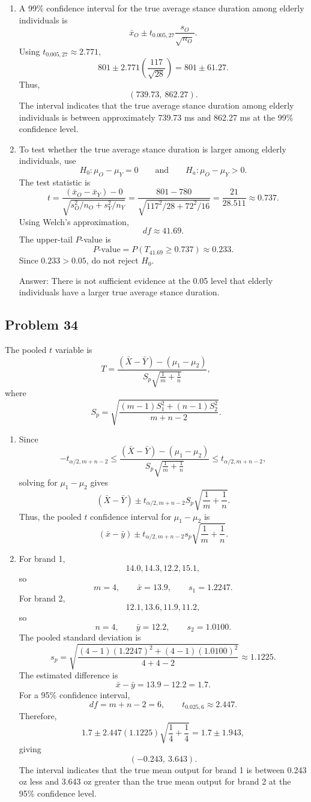 \documentclass[11pt]{article}
\begin{document}
\begin{enumerate}
\item[(a)] A 99\% confidence interval for the true average stance duration among elderly individuals is
\[
\bar{x}_O\pm t_{0.005,27}\frac{s_O}{\sqrt{n_O}}.
\]
Using $t_{0.005,27}\approx 2.771$,
\[
801\pm 2.771\left(\frac{117}{\sqrt{28}}\right)
=801\pm 61.27.
\]
Thus,
\[
(739.73,\ 862.27).
\]
The interval indicates that the true average stance duration among elderly individuals is between approximately 739.73 ms and 862.27 ms at the 99\% confidence level.

\item[(b)] To test whether the true average stance duration is larger among elderly individuals, use
\[
H_0:\mu_O-\mu_Y=0
\qquad \text{and} \qquad
H_a:\mu_O-\mu_Y>0.
\]
The test statistic is
\[
t=\frac{(\bar{x}_O-\bar{x}_Y)-0}{\sqrt{s_O^2/n_O+s_Y^2/n_Y}}
=\frac{801-780}{\sqrt{117^2/28+72^2/16}}
=\frac{21}{28.511}
\approx 0.737.
\]
Using Welch's approximation,
\[
df\approx 41.69.
\]
The upper-tail $P$-value is
\[
P\text{-value}=P(T_{41.69}\ge 0.737)\approx 0.233.
\]
Since $0.233>0.05$, do not reject $H_0$.

Answer: There is not sufficient evidence at the 0.05 level that elderly individuals have a larger true average stance duration.
\end{enumerate}

\subsection*{Problem 34}

The pooled $t$ variable is
\[
T=\frac{(\bar{X}-\bar{Y})-(\mu_1-\mu_2)}{S_p\sqrt{\frac{1}{m}+\frac{1}{n}}},
\]
where
\[
S_p=\sqrt{\frac{(m-1)S_1^2+(n-1)S_2^2}{m+n-2}}.
\]

\begin{enumerate}
\item[(a)] Since
\[
-t_{\alpha/2,m+n-2}
\le
\frac{(\bar{X}-\bar{Y})-(\mu_1-\mu_2)}{S_p\sqrt{\frac{1}{m}+\frac{1}{n}}}
\le
 t_{\alpha/2,m+n-2},
\]
solving for $\mu_1-\mu_2$ gives
\[
(\bar{X}-\bar{Y})\pm t_{\alpha/2,m+n-2}S_p\sqrt{\frac{1}{m}+\frac{1}{n}}.
\]
Thus, the pooled $t$ confidence interval for $\mu_1-\mu_2$ is
\[
(\bar{x}-\bar{y})\pm t_{\alpha/2,m+n-2}s_p\sqrt{\frac{1}{m}+\frac{1}{n}}.
\]

\item[(b)] For brand 1,
\[
14.0,
14.3,
12.2,
15.1,
\]
so
\[
m=4,
\qquad \bar{x}=13.9,
\qquad s_1=1.2247.
\]
For brand 2,
\[
12.1,
13.6,
11.9,
11.2,
\]
so
\[
n=4,
\qquad \bar{y}=12.2,
\qquad s_2=1.0100.
\]
The pooled standard deviation is
\[
s_p=\sqrt{\frac{(4-1)(1.2247)^2+(4-1)(1.0100)^2}{4+4-2}}
\approx 1.1225.
\]
The estimated difference is
\[
\bar{x}-\bar{y}=13.9-12.2=1.7.
\]
For a 95\% confidence interval,
\[
df=m+n-2=6,
\qquad t_{0.025,6}\approx 2.447.
\]
Therefore,
\[
1.7\pm 2.447(1.1225)\sqrt{\frac{1}{4}+\frac{1}{4}}
=1.7\pm 1.943,
\]
giving
\[
(-0.243,\ 3.643).
\]
The interval indicates that the true mean output for brand 1 is between 0.243 oz less and 3.643 oz greater than the true mean output for brand 2 at the 95\% confidence level.
\end{enumerate}
\end{document}
